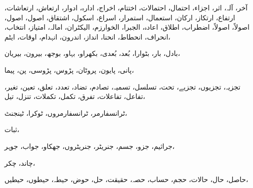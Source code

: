 آخر،               آلہ،               اثر،            اجزاء،            احتمال،            احتمالات،            اختتام،            اخراج،            ادارہ،            ادوار،            ارتعاش،            ارتعاشات،            ارتفاع،            ارتکاز،            ارکان،            استعمال،            استمرار،            اسراع،            اسکول،            اشتقاق،            اصول،            اصول،            اصولاً،            اصولاً،            اضطراب،            اطلاق،            اعادہ،            الجبرا،            الخوارزم،            الیکٹران،            امالہ،            امتیاز،            انتخاب،            انحراف،            انحطاط،            انحنا،            انداز،            اندرون،            انہدام،            اوقات،            ایٹم،

            بادل،            بار،            بٹوارا،            بُعد،            بُعدی،            بکھراو،            بہاو،            بوجھ،            بیرون،            بیریان،
            
                        پانی،            پایون،            پروٹان،            پڑوس،            پڑوسی،            پن،            پیما،            
                        
                        تجزیہ،            تجزیوں،            تجزیے،            تحت،            تسلسل،            تسمیہ،            تصادم،            تضاد،            تعدد،            تعلق،            تعین،            تغیر،            تفاعل،            تفاعلات،            تفرق،            تکمل،            تکملات،            تنزل،            تیل،
                        
            ٹرانسفارمر،            ٹرانسفارمروں،            ٹوکرا،            ٹینجنٹ،
            
                                                ثبات،
                                                
                                                            جراثیم،            جزو،            جسم،            جنریٹر،            جنریٹروں،            جھکاو،            جواب،            جوہر،
                                                            
                                                                        چاند،            چکر،            
                                                                        
                                                                        حاصل،            حال،            حالات،            حجم،            حساب،            حصہ،            حقیقت،            حل،            حوض،            حیطہ،            حیطوں،            حیطیں،            
                                                                        

